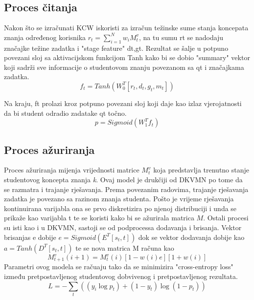 \subsection{Proces čitanja}


Nakon što se izračunati KCW iskoristi za izračun težinske sume stanja koncepata znanja određenog korisnika $r_t=\sum_{i=1}^{N}w_iM^v_t$, na tu sumu rt se nadodaju značajke težine zadatka i "stage feature" dt,gt. Rezultat se šalje u potpuno povezani sloj sa aktivacijskom funkcijom Tanh kako bi se dobio "summary" vektor koji sadrži sve informacije o studentovom znanju povezanom sa qt i značajkama zadatka.
\begin{equation}
	f_t=Tanh(W_0^T[r_t,d_t,g_t,m_t])
\end{equation}

Na kraju, ft prolazi kroz potpuno povezani sloj koji daje kao izlaz vjerojatnosti da bi student odradio
zadatake qt točno.
\begin{equation}
p=Sigmoid(W^T_1f_t)
\end{equation}


\subsection{Proces ažuriranja}

Proces ažuriranja mijenja vrijednosti matrice $M^v_t$ koja predstavlja trenutno stanje studentovog koncepta znanja \textit{k}.
Ovaj model je drukčiji od DKVMN po tome da se razmatra i trajanje rješavanja. Prema povezanim radovima, trajanje rješavanja zadatka je povezano sa razinom znanja studenta. Pošto je vrijeme rješavanja kontinuirana varijabla ona se prvo diskretizira po njenoj distribuciji i unda se prikaže kao varijabla t te se koristi kako bi se ažurirala matrica $M$. Ostali procesi su isti kao i u DKVMN, sastoji se od podprocessa dodavanja i brisanja. Vektor brisanjas e dobije $e=Sigmoid(E^T[s_t,t])$ dok se vektor dodavanja dobije kao $a=Tanh(D^T[s_t,t])$ te se nova matrica M računa kao
\begin{equation}
	M^v_{t+1}(i+1) =M^v_t (i)[1-w(i)e][1+w(i)]
\end{equation}
Parametri ovog modela se račuaju tako da se minimizira "cross-entropy loss" između pretpostavljenog studentovog
dobvivenog i pretpostavljenog rezultata. 
\begin{equation}
	L=-\sum_t ((y_i \log p_t ) + (1-y_t)\log (1-p_t))
\end{equation}






